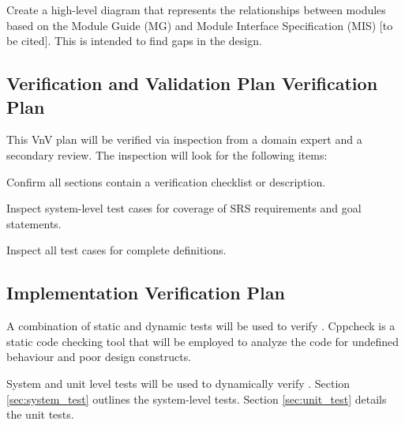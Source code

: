 \documentclass[12pt, titlepage]{article}
\begin{document}
\begin{todolist}
    \item Create a high-level diagram that represents the relationships between modules based on the
    Module Guide (MG) and Module Interface Specification (MIS) [to be cited]. This is intended to
    find gaps in the design.
\end{todolist}


\subsection{Verification and Validation Plan Verification Plan}

This VnV plan will be verified via inspection from a domain expert and a secondary review. The
inspection will look for the following items:
\begin{todolist}
    \item Confirm all sections contain a verification checklist or description.
    \item Inspect system-level test cases for coverage of SRS requirements and goal statements.
    \item Inspect all test cases for complete definitions.
\end{todolist}


\subsection{Implementation Verification Plan}

A combination of static and dynamic tests will be used to verify \progname{}. Cppcheck
\citep{cppcheck} is a static code checking tool that will be employed to analyze the code for
undefined behaviour and poor design constructs.

System and unit level tests will be used to dynamically verify \progname{}. Section
\ref{sec:system_test} outlines the system-level tests. Section \ref{sec:unit_test} details the unit
tests.

\end{document}
